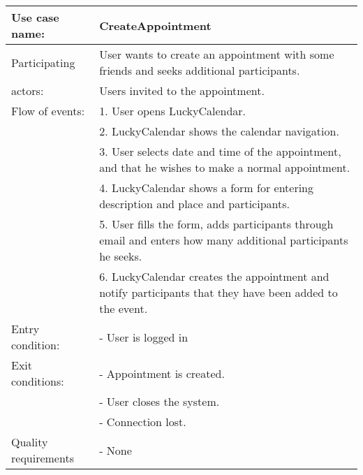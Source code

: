 {\tabulinesep=1.2mm
\begin{tabu}{ | p{3cm} | p{13cm} |}
    \hline
    Use case name: 			& 		CreateAppointment\\ \hline
    Participating  			& 		User wants to create an appointment with some friends and seeks additional participants. \\
    actors:					&		Users invited to the appointment.\\ \hline
    Flow of events: 		& 		1. User opens LuckyCalendar. \\
							&		2. LuckyCalendar shows the calendar navigation.\\
							&		3. User selects date and time of the appointment, and that he wishes to make a normal appointment.\\
							&		4. LuckyCalendar shows a form for entering description and place and participants.\\
							&		5. User fills the form, adds participants through email and enters how many additional participants he seeks.\\
							&		6. LuckyCalendar creates the appointment and notify participants that they have been added to the event.\\ \hline
    Entry condition: 		& 		- User is logged in  \\ \hline
	Exit conditions: 		&		- Appointment is created.\\
							&		- User closes the system.\\
							&		- Connection lost.\\\hline
	Quality requirements	&	 	- None \\\hline
\end{tabu}
}
